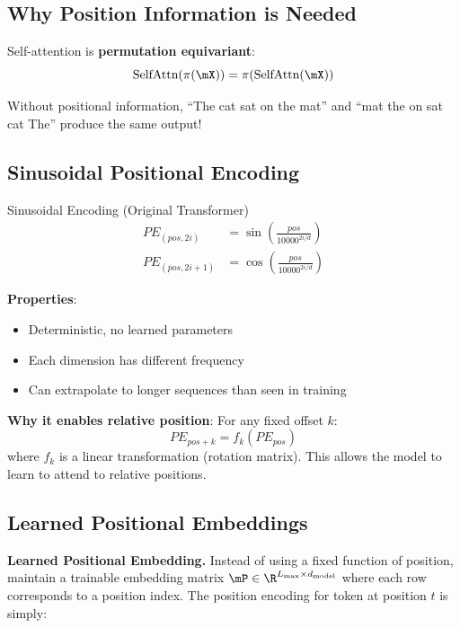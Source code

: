 \subsection{Why Position Information is Needed}

Self-attention is \textbf{permutation equivariant}:
\begin{equation}
\text{SelfAttn}(\pi(\mX)) = \pi(\text{SelfAttn}(\mX))
\end{equation}

Without positional information, ``The cat sat on the mat'' and ``mat the on sat cat The'' produce the same output!

\subsection{Sinusoidal Positional Encoding}

\begin{mathresult}{Sinusoidal Encoding (Original Transformer)}
\begin{align}
PE_{(pos, 2i)} &= \sin\left(\frac{pos}{10000^{2i/d}}\right) \\
PE_{(pos, 2i+1)} &= \cos\left(\frac{pos}{10000^{2i/d}}\right)
\end{align}
\end{mathresult}

\textbf{Properties}:
\begin{itemize}
    \item Deterministic, no learned parameters
    \item Each dimension has different frequency
    \item Can extrapolate to longer sequences than seen in training
\end{itemize}

\textbf{Why it enables relative position}:
For any fixed offset $k$:
\begin{equation}
PE_{pos+k} = f_k(PE_{pos})
\end{equation}
where $f_k$ is a linear transformation (rotation matrix). This allows the model to learn to attend to relative positions.

\subsection{Learned Positional Embeddings}

\textbf{Learned Positional Embedding.} Instead of using a fixed function of position, maintain a trainable embedding matrix $\mP \in \R^{L_{\max} \times d_{\text{model}}}$ where each row corresponds to a position index. The position encoding for token at position $t$ is simply:

